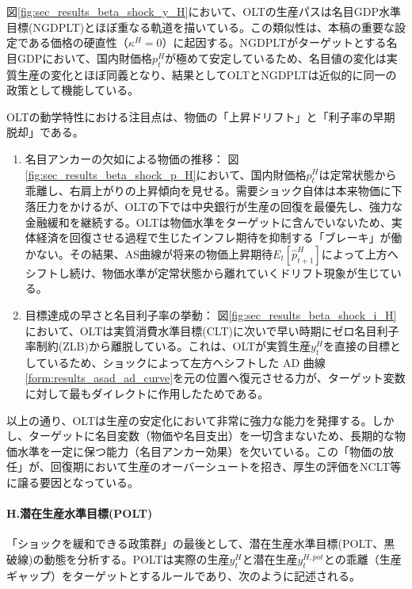 図\ref{fig:sec_results_beta_shock_y_H}において、OLTの生産パスは名目GDP水準目標(NGDPLT)とほぼ重なる軌道を描いている。この類似性は、本稿の重要な設定である価格の硬直性（\(\kappa^H=0\)）に起因する。NGDPLTがターゲットとする名目GDPにおいて、国内財価格\(p_t^H\)が極めて安定しているため、名目値の変化は実質生産の変化とほぼ同義となり、結果としてOLTとNGDPLTは近似的に同一の政策として機能している。

OLTの動学特性における注目点は、物価の「上昇ドリフト」と「利子率の早期脱却」である。

\begin{enumerate}
    \item\label{itm:sec_results_beta_shock_analysis_olt_drift} 名目アンカーの欠如による物価の推移：
    図\ref{fig:sec_results_beta_shock_p_H}において、国内財価格\(p_t^H\)は定常状態から乖離し、右肩上がりの上昇傾向を見せる。需要ショック自体は本来物価に下落圧力をかけるが、OLTの下では中央銀行が生産の回復を最優先し、強力な金融緩和を継続する。OLTは物価水準をターゲットに含んでいないため、実体経済を回復させる過程で生じたインフレ期待を抑制する「ブレーキ」が働かない。その結果、AS曲線が将来の物価上昇期待\(E_t[\hat{p}_{t+1}^H]\)によって上方へシフトし続け、物価水準が定常状態から離れていくドリフト現象が生じている。
    \item\label{itm:sec_results_beta_shock_analysis_olt_exit} 目標達成の早さと名目利子率の挙動：
    図\ref{fig:sec_results_beta_shock_i_H}において、OLTは実質消費水準目標(CLT)に次いで早い時期にゼロ名目利子率制約(ZLB)から離脱している。これは、OLTが実質生産\(y_t^H\)を直接の目標としているため、ショックによって左方へシフトした AD 曲線\eqref{form:results_asad_ad_curve}を元の位置へ復元させる力が、ターゲット変数に対して最もダイレクトに作用したためである。
\end{enumerate}

以上の通り、OLTは生産の安定化において非常に強力な能力を発揮する。しかし、ターゲットに名目変数（物価や名目支出）を一切含まないため、長期的な物価水準を一定に保つ能力（名目アンカー効果）を欠いている。この「物価の放任」が、回復期において生産のオーバーシュートを招き、厚生の評価をNCLT等に譲る要因となっている。

\paragraph{H.潜在生産水準目標(POLT)}\label{sec:sec_results_beta_shock_analysis_polt}
「ショックを緩和できる政策群」の最後として、潜在生産水準目標(POLT、黒破線)の動態を分析する。POLTは実際の生産\(y_t^H\)と潜在生産\(y_t^{H,pot}\)との乖離（生産ギャップ）をターゲットとするルールであり、次のように記述される。

